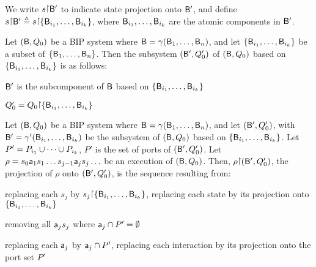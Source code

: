 We write $s \pj \B'$ to indicate state projection onto $\mathsf{B}'$, and define 
$s \pj \B' \df  s \pj \set{\B_{i_1}, \dots, \B_{i_k}}$, where $\mathsf{B}_{i_1},\dots,\mathsf{B}_{i_k}$ are the atomic
components in $\mathsf{B}'$.





\begin{definition}[Subsystem]
  \label{def.bip.subsystem}
  \label{defn:bip.subsystem}
Let $(\mathsf{B}, Q_0)$ be a BIP system where $\mathsf{B} = \gamma(\mathsf{B}_1,\dots,\mathsf{B}_n)$, and let 
$\{ \mathsf{B}_{i_1},\dots,\mathsf{B}_{i_k} \}$ be a subset of $\{ \mathsf{B}_{1},\dots,\mathsf{B}_{n} \}$.
Then the subsystem $(\mathsf{B}', Q'_0)$ of  $(\mathsf{B}, Q_0)$ based on $\{ \mathsf{B}_{i_1},\dots,\mathsf{B}_{i_k} \}$ is as follows:
\bn
\item $\mathsf{B}'$ is the subcomponent of $\mathsf{B}$ based on $\{ \mathsf{B}_{i_1},\dots,\mathsf{B}_{i_k} \}$ 
\item $Q'_0 = Q_0 \pj \set{\B_{i_1},\dots,\B_{i_k}}$
\en
\end{definition}


\begin{definition}\label{def.bip.execution.projection}
Let $(\mathsf{B}, Q_0)$ be a BIP system where $\mathsf{B} = \gamma(\mathsf{B}_1,\dots,\mathsf{B}_n)$, and let $(\mathsf{B}', Q'_0)$, with $\mathsf{B}'
= \gamma'(\mathsf{B}_{i_1},\dots,\mathsf{B}_{i_k})$ be the subsystem of $(\mathsf{B}, Q_0)$ based on $\{ \mathsf{B}_{i_1},\dots,\mathsf{B}_{i_k} \}$.
Let $P' = P_{i_1} \cup \cdots \cup P_{i_k}$, \ie $P'$ is the set of ports of $(\mathsf{B}', Q'_0)$.
%
Let $\rho = s_0 \mathsf{a}_1 s_1 \ldots s_{j-1} \mathsf{a}_j s_j \ldots$ be an execution of $(\mathsf{B}, Q_0)$.  Then, $\rho \pj (\B', Q'_0)$, the projection
of $\rho$ onto $(\mathsf{B}', Q'_0)$, is the sequence resulting from:
\bn
\item \label{def.clause.bip.execution.projection.state} 
replacing each $s_j$ by $s_j \pj \set{\B_{i_1},\dots,\B_{i_k}}$, \ie replacing each state by its projection onto $\{ \mathsf{B}_{i_1},\dots,\mathsf{B}_{i_k} \}$

\item \label{def.clause.bip.execution.projection.action} removing all $\mathsf{a}_j s_j$ where $\mathsf{a}_j \cap P' = \emptyset$   %

\item \label{def.clause.bip.execution.projection.port} replacing each $\mathsf{a}_j$ by $\mathsf{a}_j \cap P'$, \ie replacing each
interaction by its projection onto the port set $P'$ 

\en
\end{definition}



